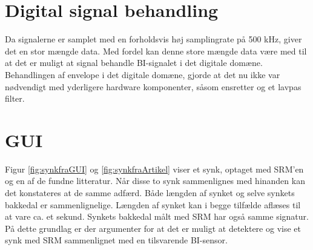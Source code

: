 \section{Digital signal behandling}
Da signalerne er samplet med en forholdsvis høj samplingrate på 500 kHz, giver det en stor mængde data. Med fordel kan denne store mængde data være med til at det er muligt at signal behandle BI-signalet i det digitale domæne. Behandlingen af envelope i det digitale domæne, gjorde at det nu ikke var nødvendigt med yderligere hardware komponenter, såsom ensretter og et lavpas filter.

\section{GUI}

Figur \ref{fig:synkfraGUI} og \ref{fig:synkfraArtikel} viser et synk, optaget med SRM'en og en af de fundne litteratur. Når disse to synk sammenlignes med hinanden kan det konstateres at de samme adfærd. Både længden af synket og selve synkets bakkedal er sammenlignelige. Længden af synket kan i begge tilfælde aflæses til at vare ca. et sekund. Synkets bakkedal målt med SRM har også samme signatur. På dette grundlag er der argumenter for at det er muligt at detektere og vise et synk med SRM sammenlignet med en tilsvarende BI-sensor.

